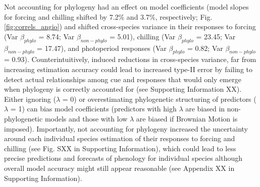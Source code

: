 \documentclass{article}\usepackage[]{graphicx}\usepackage[]{color}
\begin{document}
Not accounting for phylogeny had an effect on model coefficients (model slopes for forcing and chilling shifted by 7.2\% and 3.7\%, respectively; Fig. \ref{fig:correls_angio}) and shifted cross-species variance in their responses to forcing (Var $\beta_{phylo}$ = 8.74; Var $\beta_{non-phylo}$ = 5.01), chilling (Var $\beta_{phylo}$ = 23.45; Var $\beta_{non-phylo}$ = 17.47), and photoperiod responses (Var $\beta_{phylo}$ = 0.82; Var $\beta_{non-phylo}$ = 0.93). Counterintuitively, induced reductions in cross-species variance, far from increasing estimation accuracy could lead to increased type-II error by failing to detect actual relationships among cue and responses that would only emerge when phylogeny is correctly accounted for (see Supporting Information XX). Either ignoring ($\lambda$ = 0) or overestimating phylogenetic structuring of predictors ($\lambda$ = 1) can bias model coefficients (predictors with high $\lambda$ are biased in non-phylogenetic models and those with low $\lambda$ are biased if Brownian Motion is imposed). Importantly, not accounting for phylogeny increased the uncertainty around each individual species estimation of their responses to forcing and chilling (see Fig. SXX in Supporting Information), which could lead to less precise predictions and forecasts of phenology for individual species although overall model accuracy might still appear reasonable (see Appendix XX in Supporting Information).

\end{document}
